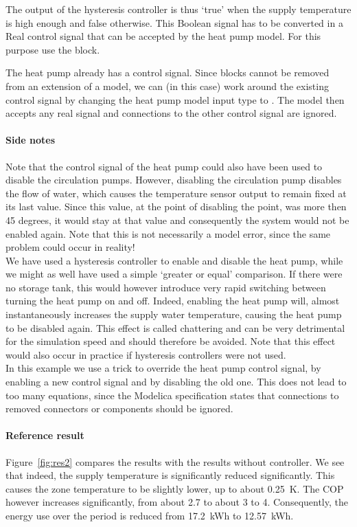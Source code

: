 \documentclass[10pt,a4paper]{article}
\begin{document}
The output of the hysteresis controller is thus `true' when the supply temperature is 
high enough and false otherwise.
This Boolean signal has to be converted in a Real control signal that can be
accepted by the heat pump model.
For this purpose use the  block.

The heat pump already has a control signal. 
Since blocks cannot be removed from an extension of a model,
we can (in this case) work around the existing control signal
by changing the heat pump model input type to .
The model then accepts any real signal and connections to the other control 
signal are ignored. 


\paragraph{Side notes}
Note that the control signal of the heat pump could also have been used to disable
the circulation pumps.
However, disabling the circulation pump disables the flow of water,
which causes the temperature sensor output to remain fixed at
its last value.
Since this value, at the point of disabling the point, was more then 45 degrees,
it would stay at that value and consequently the system would not be enabled again.
Note that this is not necessarily a model error, since the same problem could
occur in reality!\\


We have used a hysteresis controller to enable and disable the heat pump,
while we might as well have used a simple `greater or equal' comparison.
If there were no storage tank,
this would however introduce very rapid switching between turning the heat pump on
and off. Indeed, enabling the heat pump will, almost instantaneously increases the 
supply water temperature, causing the heat pump to be disabled again.
This effect is called chattering and can be very detrimental for the simulation speed 
and should therefore be avoided.
Note that this effect would also occur in practice if hysteresis controllers were not used.\\

In this example we use a trick to override the heat pump control signal, by enabling a new
control signal and by disabling the old one. This does not lead
to too many equations, since the Modelica specification states that 
connections to removed connectors or components should be ignored.


\paragraph{Reference result}
Figure~\ref{fig:res2} compares the results with the results without controller.
We see that indeed, the supply temperature is significantly reduced significantly.
This causes the zone temperature to be slightly lower, up to about 0.25~K.
The COP however increases significantly, from about 2.7 to about 3 to 4.
Consequently, the energy use over the period is reduced from 17.2~kWh
to 12.57~kWh.\\
\end{document}
